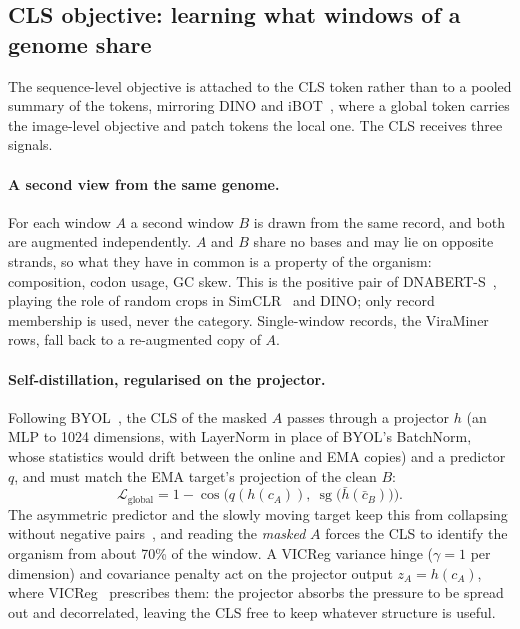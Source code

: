 \documentclass[10pt,twocolumn,a4paper]{article}
\begin{document}
\subsection{CLS objective: learning what windows of a genome share}\label{sec:cls}

The sequence-level objective is attached to the CLS token rather than to a pooled
summary of the tokens, mirroring DINO and iBOT~\cite{caron2021dino,zhou2022ibot},
where a global token carries the image-level objective and patch tokens the local
one. The CLS receives three signals.

\paragraph{A second view from the same genome.}
For each window $A$ a second window $B$ is drawn from the same record, and both
are augmented independently. $A$ and $B$ share no bases and may lie on opposite
strands, so what they have in common is a property of the organism: composition,
codon usage, GC skew. This is the positive pair of
DNABERT-S~\cite{zhou2024dnaberts}, playing the role of random crops in
SimCLR~\cite{chen2020simclr} and DINO; only record membership is used, never the
category. Single-window records, the ViraMiner rows, fall back to a re-augmented
copy of $A$.

\paragraph{Self-distillation, regularised on the projector.}
Following BYOL~\cite{grill2020byol}, the CLS of the masked $A$ passes through a
projector $h$ (an MLP to 1024 dimensions, with LayerNorm in place of BYOL's
BatchNorm, whose statistics would drift between the online and EMA copies) and a
predictor $q$, and must match the EMA target's projection of the
clean $B$:
\begin{equation}
\mathcal{L}_{\text{global}}
 = 1-\cos\!\bigl(q(h(c_A)),\ \operatorname{sg}\bigl(\bar h(\bar c_B)\bigr)\bigr).
\end{equation}
The asymmetric predictor and the slowly moving target keep this from collapsing
without negative pairs~\cite{tian2021understanding,chen2021simsiam}, and reading
the \emph{masked} $A$ forces the CLS to identify the organism from about 70\% of
the window. A VICReg variance hinge ($\gamma=1$ per dimension) and covariance
penalty act on the projector output $z_A=h(c_A)$, where
VICReg~\cite{bardes2022vicreg} prescribes them: the projector absorbs the
pressure to be spread out and decorrelated, leaving the CLS free to keep whatever
structure is useful.
\end{document}
